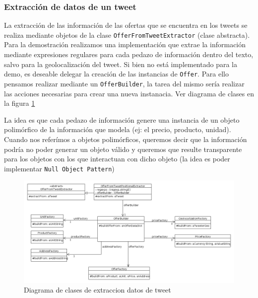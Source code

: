 \subsubsection{Extracci\'on de datos de un tweet}
La extracci\'on de las informaci\'on de las ofertas que se encuentra en los tweets se realiza mediante objetos de la clase \texttt{OfferFromTweetExtractor} (clase abstracta).
Para la demostraci\'on realizamos una implementaci\'on que extrae la informaci\'on mediante expresiones regulares para cada pedazo de informaci\'on dentro del texto, salvo para la geolocalizaci\'on del tweet.
Si bien no est\'a implementado para la demo, es deseable delegar la creaci\'on de las instancias de \texttt{Offer}. Para ello pensamos realizar mediante un \texttt{OfferBuilder}, la tarea del mismo ser\'ia realizar las acciones necesarias para crear una nueva instanacia. Ver diagrama de clases en la figura \ref{fig:class_parsing}

La idea es que cada pedazo de informaci\'on genere una instancia de un objeto polim\'orfico de la informaci\'on que modela (ej: el precio, producto, unidad).
Cuando nos refer\'imos a objetos polim\'orficos, queremos decir que la informaci\'on podr\'ia no poder generar un objeto v\'alido y queremos que resulte transparente para los objetos con los que interactuan con dicho objeto (la idea es poder implementar \texttt{Null Object Pattern})

\begin{figure}[h]
\centerline{\includegraphics[width=0.9\paperwidth]{./imgs/class_diagram_parsing.png}}
\caption{Diagrama de clases de extraccion datos de tweet}
\label{fig:class_parsing}
\end{figure}



